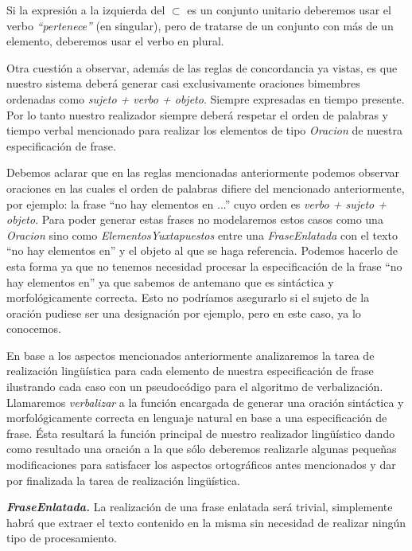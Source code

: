 \noindent
Si la expresión a la izquierda del $\subset$ es un conjunto unitario deberemos usar el verbo \emph{``pertenece''} (en singular), pero de tratarse de un conjunto con más de un elemento, deberemos usar el verbo en plural.

\medskip
Otra cuestión a observar, además de las reglas de concordancia ya vistas, es que nuestro sistema deberá generar casi exclusivamente oraciones bimembres ordenadas como \emph{sujeto + verbo + objeto}. Siempre expresadas en tiempo presente. Por lo tanto nuestro realizador siempre deberá respetar el orden de palabras y tiempo verbal mencionado para realizar los elementos de tipo \emph{Oracion} de nuestra especificación de frase. 

Debemos aclarar que en las reglas mencionadas anteriormente podemos observar oraciones en las cuales el orden de palabras difiere del mencionado anteriormente, por ejemplo: la frase ``no hay elementos en ...'' cuyo orden es \emph{verbo + sujeto + objeto}. Para poder generar estas frases no modelaremos estos casos como una \emph{Oracion} sino como \emph{ElementosYuxtapuestos} entre una \emph{FraseEnlatada} con el texto ``no hay elementos en'' y el objeto al que se haga referencia. Podemos hacerlo de esta forma ya que no tenemos necesidad procesar la especificación de la frase ``no hay elementos en'' ya que sabemos de antemano que es sintáctica y morfológicamente correcta. Esto no podríamos asegurarlo si el sujeto de la oración pudiese ser una designación por ejemplo, pero en este caso, ya lo conocemos.


\bigskip
En base a los aspectos mencionados anteriormente analizaremos la tarea de realización lingüística para cada elemento de nuestra especificación de frase ilustrando cada caso con un pseudocódigo para el algoritmo de verbalización. Llamaremos \emph{verbalizar} a la función encargada de generar una oración sintáctica y morfológicamente correcta en lenguaje natural en base a una especificación de frase. Ésta resultará la función principal de nuestro realizador lingüístico dando como resultado una oración a la que sólo deberemos realizarle algunas pequeñas modificaciones para satisfacer los aspectos ortográficos antes mencionados y dar por finalizada la tarea de realización lingüística.

\medskip
\noindent
\textbf{\emph{FraseEnlatada.}} La realización de una frase enlatada será trivial, simplemente habrá que extraer el texto contenido en la misma sin necesidad de realizar ningún tipo de procesamiento.

